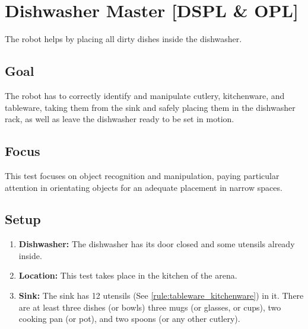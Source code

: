 \section{Dishwasher Master [DSPL \& OPL]}
The robot helps by placing all dirty dishes inside the dishwasher.

\subsection{Goal}
The robot has to correctly identify and manipulate cutlery, kitchenware, and tableware, taking them from the sink and safely placing them in the dishwasher rack, as well as leave the dishwasher ready to be set in motion.

\subsection{Focus}
This test focuses on object recognition and manipulation, paying particular attention in orientating objects for an adequate placement in narrow spaces.

\subsection{Setup}
\begin{enumerate}
	\item \textbf{Dishwasher:} The dishwasher has its door closed and some utensils already inside.
	\item \textbf{Location:} This test takes place in the kitchen of the arena.
	\item \textbf{Sink:} The sink has 12 utensils (See \ref{rule:tableware_kitchenware}) in it. There are at least three dishes (or bowls) three mugs (or glasses, or cups), two cooking pan (or pot), and two spoons (or any other cutlery).
\end{enumerate}


